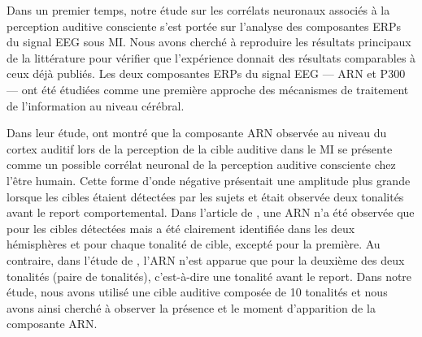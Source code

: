 Dans un premier temps, notre étude sur les corrélats neuronaux associés à la perception auditive consciente s'est portée sur l'analyse des composantes ERPs du signal EEG sous MI. 
Nous avons cherché à reproduire les résultats principaux de la littérature \citep{dykstra2016neural, giani2015detecting, gutschalk2008neural, wiegand2012correlates} pour vérifier que l'expérience donnait des résultats comparables à ceux déjà publiés. 
Les deux composantes ERPs du signal EEG --- ARN et P300 --- ont été étudiées comme une première approche des mécanismes de traitement de l'information au niveau cérébral. 

Dans leur étude, \cite{gutschalk2008neural} ont montré que la composante ARN observée au niveau du cortex auditif lors de la perception de la cible auditive dans le MI se présente comme un possible corrélat neuronal de la perception auditive consciente chez l'être humain. 
Cette forme d'onde négative présentait une amplitude plus grande lorsque les cibles étaient détectées par les sujets et était observée deux tonalités avant le report comportemental. 
Dans l'article de \cite{wiegand2012correlates}, une ARN n'a été observée que pour les cibles détectées mais a été clairement identifiée dans les deux hémisphères et pour chaque tonalité de cible, excepté pour la première. 
Au contraire, dans l'étude de \cite{giani2015detecting}, l'ARN n'est apparue que pour la deuxième des deux tonalités (paire de tonalités), c'est-à-dire une tonalité avant le report. 
Dans notre étude, nous avons utilisé une cible auditive composée de 10 tonalités et nous avons ainsi cherché à observer la présence et le moment d'apparition de la composante ARN. 

